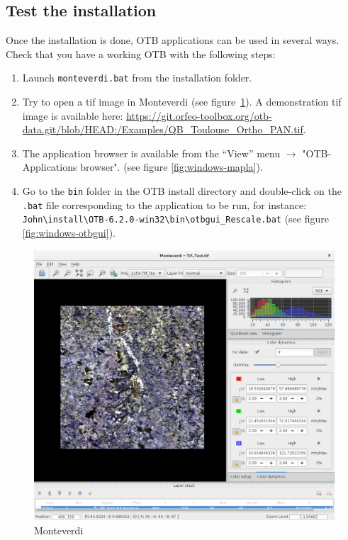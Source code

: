 \documentclass[10pt,a4paper]{article}
\begin{document}
\subsection{Test the installation}
Once the installation is done, OTB applications can be used in several ways. Check that you have a working OTB with the following steps:
\begin{enumerate}

\item Launch \texttt{monteverdi.bat} from the installation folder.

\item Try to open a tif image in Monteverdi (see
figure~\ref{fig:monteverdi}). A demonstration tif image is available here: \url{https://git.orfeo-toolbox.org/otb-data.git/blob/HEAD:/Examples/QB\_Toulouse\_Ortho\_PAN.tif}.

\item The application browser is available from the ``View'' menu 
$\rightarrow$ "OTB-Applications browser".
(see figure \ref{fig:windows-mapla}).

\item Go to the \texttt{bin} folder in the OTB install directory and double-click on the \texttt{.bat} file corresponding to the application to be run, for instance:\\
\texttt{John{\textbackslash}install{\textbackslash}OTB-6.2.0-win32{\textbackslash}bin{\textbackslash}otbgui\_Rescale.bat}
(see figure \ref{fig:windows-otbgui}).

\end{enumerate}

\begin{figure}[h]
  \center
  \includegraphics[width=1\textwidth]{Art/monteverdi-tif.png}
  \caption[]{Monteverdi}
  \label{fig:monteverdi}
\end{figure}
\end{document}
